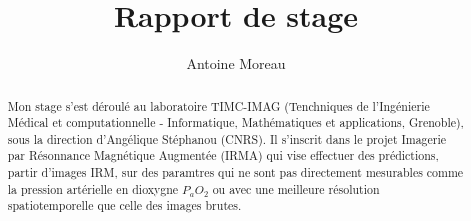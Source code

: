 \documentclass[a4paper,10pt]{article}
\title{Rapport de stage}
\author{Antoine Moreau}
\begin{document}
\maketitle

\begin{abstract}
Mon stage s'est d\'eroul\'e au laboratoire TIMC-IMAG (Tenchniques de l'Ingénierie M\'edical et computationnelle - %
Informatique, Mathématiques et applications, Grenoble), sous la direction d'Angélique Stéphanou (CNRS). %
Il s'inscrit dans le projet Imagerie par Résonnance Magn\'etique Augment\'ee (IRMA) qui vise  effectuer des pr\'edictions, %
 partir d'images IRM, sur des paramtres qui ne sont pas directement mesurables comme la pression art\'erielle en dioxygne $P_aO_2$ %
ou avec une meilleure r\'esolution spatiotemporelle que celle des images brutes.

\end{abstract}









\end{document}
